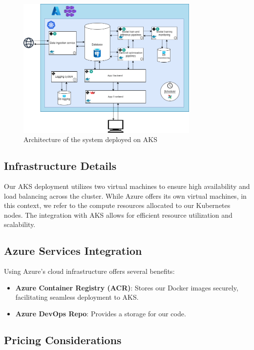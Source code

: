 \begin{figure}[H]
    \centering
    \includegraphics[width=0.8\textwidth, keepaspectratio]{images/diagrem_archi_services.png}
    \caption{Architecture of the system deployed on AKS}
    \label{fig:diagramme_arch_aks}
\end{figure}

\subsection{Infrastructure Details}

Our AKS deployment utilizes two virtual machines to ensure high availability and load balancing across the cluster. While Azure offers its own virtual machines, in this context, we refer to the compute resources allocated to our Kubernetes nodes. The integration with AKS allows for efficient resource utilization and scalability.

\subsection{Azure Services Integration}

Using Azure's cloud infrastructure offers several benefits:

\begin{itemize}
    \item \textbf{Azure Container Registry (ACR)}: Stores our Docker images securely, facilitating seamless deployment to AKS.
    \item \textbf{Azure DevOps Repo}: Provides a storage for our code.
\end{itemize}

\subsection{Pricing Considerations}

